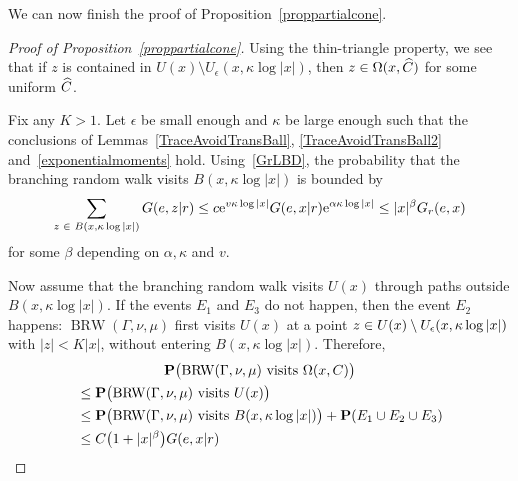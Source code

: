 \documentclass[10pt]{amsart}
\theoremstyle{definition}\newtheorem{defi}[theo]{Definition}\newtheorem{rema}[theo]{Remark}\newtheorem{exam}[theo]{Example}\newtheorem{exem}[theo]{Example}\newtheorem{nota}[theo]{Notation}
\newcommand{\rme}{\mathrm{e}}
\newcommand{\bfP}{\mathbf{P}}
\DeclareMathOperator{\BRW}{BRW}
\let\originalleft\left
\let\originalright\right
\renewcommand{\left}{\mathopen{}\mathclose\bgroup\originalleft}
\renewcommand{\right}{\aftergroup\egroup\originalright}
\let\oldin\in
\renewcommand{\in}{\mathchoice{\oldin}{\oldin}{\,\oldin\,}{\,\oldin\,}}
\let\oldle\le
\renewcommand{\le}{\mathchoice{\oldle}{\oldle}{\,\oldle\,}{\,\oldle\,}}
\let\oldhat\hat
\renewcommand*{\hat}[1]{\mathchoice{\widehat{#1}}{\widehat{#1}}{\oldhat{#1}}{\oldhat{#1}}}
\begin{document}
We can now finish the proof of Proposition~\ref{proppartialcone}.
\begin{proof}[Proof of Proposition~\ref{proppartialcone}]
Using the thin-triangle property, we see that if $z$ is contained in $U(x)\setminus U_{\epsilon}(x,\kappa \log |x|)$, then $z\in \Omega(x, \hat C)$ for some uniform $\hat C$.

Fix any $K>1$. Let $\epsilon$ be small enough and $\kappa$ be large enough such that the conclusions of Lemmas~\ref{TraceAvoidTransBall}, \ref{TraceAvoidTransBall2} and~\ref{exponentialmoments} hold. Using~\eqref{GrLBD}, the probability that the branching random walk visits $B(x, \kappa \log |x|)$ is bounded by
\[
\sum_{z \in B(x, \kappa \log |x|)} G(e, z|r)\le c\rme^{v\kappa \log |x|} G(e,x|r) \rme^{\alpha \kappa \log |x|}\le |x|^{\beta}G_r(e,x)
\]
for some $\beta$ depending on $\alpha, \kappa$ and $v$.

Now assume that the branching random walk visits $U(x)$ through paths outside $B(x, \kappa \log |x|)$. If the events $E_1$ and $E_3$ do not happen, then the event $E_2$ happens: $\BRW(\Gamma,\nu,\mu)$ first visits $U(x)$ {at a point} $z\in U(x)\setminus U_{\epsilon}(x,\kappa \log |x|)$ with $|z|< K|x|$, without entering $B(x, \kappa \log |x|)$. Therefore,
\begin{multline*}
\bfP\bigl(\BRW(\Gamma,\nu,\mu)\text{ visits } \Omega(x, C)\bigr)\\
\begin{aligned}
&\leq \bfP \bigl(\BRW(\Gamma,\nu,\mu)\text{ visits } U(x)\bigr) \\
&\leq \bfP\bigl(\BRW(\Gamma,\nu,\mu)\text{ visits }B(x, \kappa \log |x|)\bigr)+\bfP(E_1\cup E_2\cup E_3) \\
&\leq C\left(1+|x|^{\beta}\right)G(e,x|r) \qedhere
\end{aligned}
\end{multline*}
\end{proof}
\end{document}
